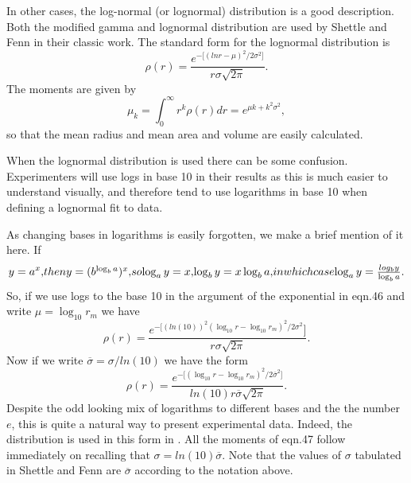 \begin{flushleft}
In other cases, the log-normal (or lognormal) distribution is a good description.
Both the modified gamma and lognormal distribution are used by
Shettle and Fenn \cite{ShettleFenn:Mybib} in their classic work.
The standard form for the lognormal distribution is
\begin{equation}
\rho(r)= \frac{ e^{-\lbrack (ln r-\mu)^2/2 \sigma^2 \rbrack} }{ r \sigma \sqrt{2 \pi}}.
\end{equation}
The moments are given by
\begin{equation}
\mu_k= \int_0^\infty r^k \rho(r) dr=e^{\mu k +k^2 \sigma^2},
\end{equation}
so that the mean radius and mean area and volume are easily calculated.

When the lognormal distribution is used there can be some confusion.
Experimenters will use logs in base 10 in their results as this is much 
easier to understand visually, and therefore tend to use logarithms in base 10
when defining a lognormal fit to data.

As changing bases in logarithms is easily forgotten, we make a brief mention
of it here. If
\begin{equation}
y=a^x,
$$ then  $$
y=(b^{\log_b a})^x,
$$    so $$
\log_a y = x, 
$$    $$
\log_b y = x \log_b a,
$$ in which case $$
\log_a y= \frac{log_b y}{\log_b a}.
\end{equation}
So, if we use  logs to the base 10 in the argument of the exponential in eqn.46
and write $\mu =\log_{10} r_m$ we have
\begin{equation}
\rho(r)= \frac{ e^{ -\lbrack (ln(10))^2(\log_{10} r  -\log_{10} r_m)^2/2 \sigma^2}\rbrack }{ r \sigma \sqrt{2 \pi}}.
\end{equation}
Now if we write $ {\overline \sigma} = \sigma/ln(10)$ we have the form
\begin{equation}
\rho(r)= \frac{ e^{ -\lbrack(\log_{10} r  -\log_{10} r_m)^2/2
 {\overline \sigma}^2 \rbrack} }{ln(10) r {\overline\sigma} \sqrt{2 \pi}}.
\end{equation}
Despite the odd looking mix of logarithms to different bases and the the number $e$,
this is quite a natural way to present experimental data. Indeed, the distribution
is used in this form in \cite{ShettleFenn:Mybib}. All the moments of eqn.47 follow 
immediately on recalling that $\sigma = ln(10) {\overline \sigma}$. Note
that the values of $\sigma$ tabulated in Shettle and Fenn are ${\overline \sigma}$
according to the notation above.


\end{flushleft}
